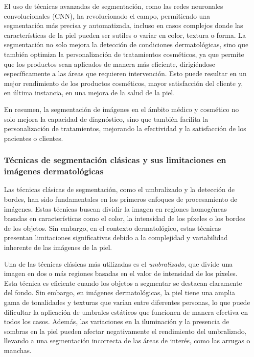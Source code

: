 El uso de técnicas avanzadas de segmentación, como las redes neuronales convolucionales (CNN), ha revolucionado el campo, permitiendo una segmentación más precisa y automatizada, incluso en casos complejos donde las características de la piel pueden ser sutiles o variar en color, textura o forma. La segmentación no solo mejora la detección de condiciones dermatológicas, sino que también optimiza la personalización de tratamientos cosméticos, ya que permite que los productos sean aplicados de manera más eficiente, dirigiéndose específicamente a las áreas que requieren intervención. Esto puede resultar en un mejor rendimiento de los productos cosméticos, mayor satisfacción del cliente y, en última instancia, en una mejora de la salud de la piel. \parencite{mohammadi2019}

En resumen, la segmentación de imágenes en el ámbito médico y cosmético no solo mejora la capacidad de diagnóstico, sino que también facilita la personalización de tratamientos, mejorando la efectividad y la satisfacción de los pacientes o clientes. \parencite{mohammadi2019}
\subsubsection{Técnicas de segmentación clásicas y sus limitaciones en imágenes dermatológicas}
Las técnicas clásicas de segmentación, como el umbralizado y la detección de bordes, han sido fundamentales en los primeros enfoques de procesamiento de imágenes. Estas técnicas buscan dividir la imagen en regiones homogéneas basadas en características como el color, la intensidad de los píxeles o los bordes de los objetos. Sin embargo, en el contexto dermatológico, estas técnicas presentan limitaciones significativas debido a la complejidad y variabilidad inherente de las imágenes de la piel. \parencite{mohammadi2019}

Una de las técnicas clásicas más utilizadas es el \textit{umbralizado}, que divide una imagen en dos o más regiones basadas en el valor de intensidad de los píxeles. Esta técnica es eficiente cuando los objetos a segmentar se destacan claramente del fondo. Sin embargo, en imágenes dermatológicas, la piel tiene una amplia gama de tonalidades y texturas que varían entre diferentes personas, lo que puede dificultar la aplicación de umbrales estáticos que funcionen de manera efectiva en todos los casos. Además, las variaciones en la iluminación y la presencia de sombras en la piel pueden afectar negativamente el rendimiento del umbralizado, llevando a una segmentación incorrecta de las áreas de interés, como las arrugas o manchas. \parencite{yoo2020}


